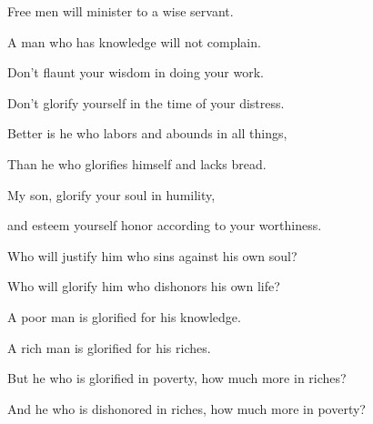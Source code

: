 {\par }{\Q {}Free men will minister to a wise servant.
\par }{\QB A man who has knowledge will not complain.
\par }{\BB \par }{\Q {}Don’t flaunt your wisdom in doing your work.
\par }{\QB Don’t glorify yourself in the time of your distress.
\par }{\Q {} Better is he who labors and abounds in all things,
\par }{\QB Than he who glorifies himself and lacks bread.
\par }{\Q {}My son, glorify your soul in humility,
\par }{\QB and esteem yourself honor according to your worthiness.
\par }{\Q {}Who will justify him who sins against his own soul?
\par }{\QB Who will glorify him who dishonors his own life?
\par }{\BB \par }{\Q {}A poor man is glorified for his knowledge.
\par }{\QB A rich man is glorified for his riches.
\par }{\Q {}But he who is glorified in poverty, how much more in riches?
\par }{\QB And he who is dishonored in riches, how much more in poverty?
\par }{\BB \par }
